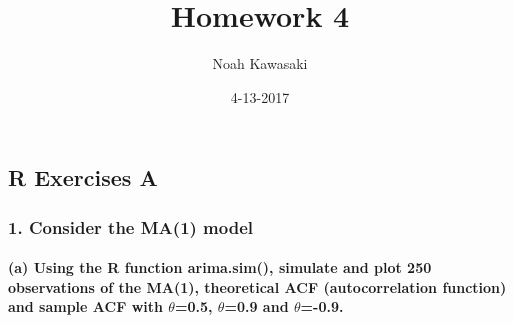 \documentclass[]{article}
\title{Homework 4}
\author{Noah Kawasaki}
\date{4-13-2017}
\let\oldparagraph\paragraph
\renewcommand{\paragraph}[1]{\oldparagraph{#1}\mbox{}}
\begin{document}
\maketitle

\subsection{R Exercises A}\label{r-exercises-a}

\subsubsection{1. Consider the MA(1)
model}\label{consider-the-ma1-model}

\paragraph{\texorpdfstring{(a) Using the R function arima.sim(),
simulate and plot 250 observations of the MA(1), theoretical ACF
(autocorrelation function) and sample ACF with \(\theta\)=0.5,
\(\theta\)=0.9 and
\(\theta\)=-0.9.}{(a) Using the R function arima.sim(), simulate and plot 250 observations of the MA(1), theoretical ACF (autocorrelation function) and sample ACF with \textbackslash{}theta=0.5, \textbackslash{}theta=0.9 and \textbackslash{}theta=-0.9.}}\label{a-using-the-r-function-arima.sim-simulate-and-plot-250-observations-of-the-ma1-theoretical-acf-autocorrelation-function-and-sample-acf-with-theta0.5-theta0.9-and-theta-0.9.}
\end{document}

